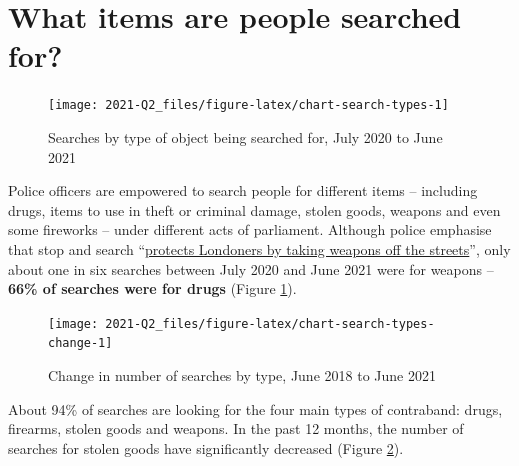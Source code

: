 \documentclass[
  a4paper,
  twoside, 11pt]{article}
\begin{document}
\hypertarget{what-items-are-people-searched-for}{%
\section{What items are people searched for?}\label{what-items-are-people-searched-for}}



\begin{figure}[tb]

{\centering \texttt{[image: 2021-Q2\_files/figure-latex/chart-search-types-1]} 

}

\caption{Searches by type of object being searched for, July 2020 to June 2021}\label{fig:chart-search-types}
\end{figure}

Police officers are empowered to search people for different items -- including drugs, items to use in theft or criminal damage, stolen goods, weapons and even some fireworks -- under different acts of parliament. Although police emphasise that stop and search ``\href{https://www.met.police.uk/police-forces/metropolitan-police/areas/about-us/about-the-met/stop-and-search/}{protects Londoners by taking weapons off the streets}'', only about one in six searches between July 2020 and June 2021 were for weapons -- \textbf{66\% of searches were for drugs} (Figure \ref{fig:chart-search-types}).



\begin{figure}[bh]

{\centering \texttt{[image: 2021-Q2\_files/figure-latex/chart-search-types-change-1]} 

}

\caption{Change in number of searches by type, June 2018 to June 2021}\label{fig:chart-search-types-change}
\end{figure}

About 94\% of searches are looking for the four main types of contraband: drugs, firearms, stolen goods and weapons. In the past 12 months, the number of searches for stolen goods have significantly decreased (Figure \ref{fig:chart-search-types-change}).
\end{document}
